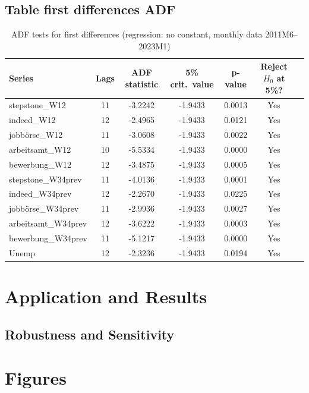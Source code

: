 \documentclass[12pt,a4paper]{article}
\begin{document}
\subsection{Table first differences ADF}
\begin{table}[htbp]
\centering
\caption{ADF tests for first differences (regression: no constant, monthly data 2011M6--2023M1)}
\label{tab:adf_diff_nc}
\begin{tabular}{lcccccc}
\hline\hline
Series & Lags & ADF statistic & 5\% crit.\ value & p-value & Reject $H_0$ at 5\%? \\
\hline
stepstone\_W12        & 11 & -3.2242 & -1.9433 & 0.0013 & Yes \\
indeed\_W12           & 12 & -2.4965 & -1.9433 & 0.0121 & Yes \\
jobbörse\_W12         & 11 & -3.0608 & -1.9433 & 0.0022 & Yes \\
arbeitsamt\_W12       & 10 & -5.5334 & -1.9433 & 0.0000 & Yes \\
bewerbung\_W12        & 12 & -3.4875 & -1.9433 & 0.0005 & Yes \\
stepstone\_W34prev    & 11 & -4.0136 & -1.9433 & 0.0001 & Yes \\
indeed\_W34prev       & 12 & -2.2670 & -1.9433 & 0.0225 & Yes \\
jobbörse\_W34prev     & 11 & -2.9936 & -1.9433 & 0.0027 & Yes \\
arbeitsamt\_W34prev   & 12 & -3.6222 & -1.9433 & 0.0003 & Yes \\
bewerbung\_W34prev    & 11 & -5.1217 & -1.9433 & 0.0000 & Yes \\
Unemp                 & 12 & -2.3236 & -1.9433 & 0.0194 & Yes \\
\hline\hline
\end{tabular}
\end{table}


\section{Application and Results}


\subsection{Robustness and Sensitivity}




\newpage
\section{Figures}
\end{document}
